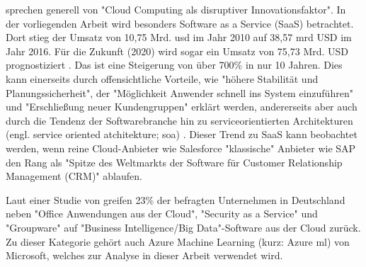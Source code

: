 \citep[S.~23]{appelrath_future_2014-1} sprechen generell von "Cloud Computing als disruptiver Innovationsfaktor". In der vorliegenden Arbeit wird besonders Software as a Service (SaaS) betrachtet. Dort stieg der Umsatz von 10,75 Mrd. \gls{usd} im Jahr 2010 auf 38,57 \gls{mrd} USD im Jahr 2016. Für die Zukunft (2020) wird sogar ein Umsatz von 75,73 Mrd. USD prognostiziert \citep{gartner_umsatz_2017}. Das ist eine Steigerung von über 700\% in nur 10 Jahren. Dies kann einerseits durch offensichtliche Vorteile, wie "höhere Stabilität und Planungssicherheit", der "Möglichkeit Anwender schnell ins System einzuführen" und "Erschließung neuer Kundengruppen"\citep{fraunhofer_vorteile_2010} erklärt werden, andererseits aber auch durch die Tendenz der Softwarebranche hin zu serviceorientierten Architekturen (engl. service oriented atchitekture; \gls{soa}) \citep[S.~22]{appelrath_future_2014-1}. Dieser Trend zu SaaS kann beobachtet werden, wenn reine Cloud-Anbieter wie Salesforce "klassische" Anbieter wie SAP den Rang als "Spitze des Weltmarkts der Software für Customer Relationship Management (CRM)"\citep{fritsch_salesforce.com_2013} ablaufen.\par
Laut einer Studie von \citep{bitkom_welche_2017} greifen 23\% der befragten Unternehmen in Deutschland neben "Office Anwendungen aus der Cloud", "Security as a Service" und "Groupware" auf "Business Intelligence/Big Data"-Software aus der Cloud zurück. Zu dieser Kategorie gehört auch Azure Machine Learning (kurz: Azure \gls{ml}) von Microsoft, welches zur Analyse in dieser Arbeit verwendet wird.